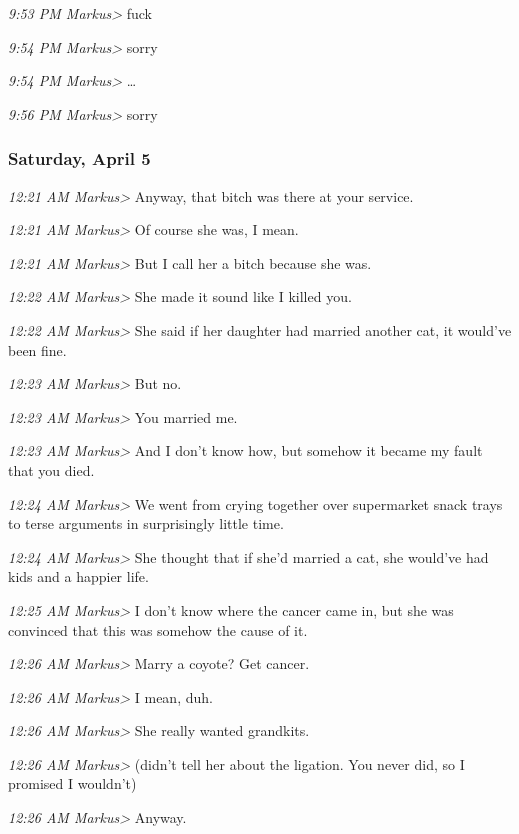 {\emph{9:53 PM Markus\textgreater{}} fuck

\emph{9:54 PM Markus\textgreater{}} sorry

\emph{9:54 PM Markus\textgreater{}} \ldots{}

\emph{9:56 PM Markus\textgreater{}} sorry

\subsubsection*{Saturday, April 5}\label{saturday-april-5}

\emph{12:21 AM Markus\textgreater{}} Anyway, that bitch was there at
your service.

\emph{12:21 AM Markus\textgreater{}} Of course she was, I mean.

\emph{12:21 AM Markus\textgreater{}} But I call her a bitch because she
was.

\emph{12:22 AM Markus\textgreater{}} She made it sound like I killed
you.

\emph{12:22 AM Markus\textgreater{}} She said if her daughter had
married another cat, it would've been fine.

\emph{12:23 AM Markus\textgreater{}} But no.

\emph{12:23 AM Markus\textgreater{}} You married me.

\emph{12:23 AM Markus\textgreater{}} And I don't know how, but somehow
it became my fault that you died.

\emph{12:24 AM Markus\textgreater{}} We went from crying together over
supermarket snack trays to terse arguments in surprisingly little time.

\emph{12:24 AM Markus\textgreater{}} She thought that if she'd married a
cat, she would've had kids and a happier life.

\emph{12:25 AM Markus\textgreater{}} I don't know where the cancer came
in, but she was convinced that this was somehow the cause of it.

\emph{12:26 AM Markus\textgreater{}} Marry a coyote? Get cancer.

\emph{12:26 AM Markus\textgreater{}} I mean, duh.

\emph{12:26 AM Markus\textgreater{}} She really wanted grandkits.

\emph{12:26 AM Markus\textgreater{}} (didn't tell her about the
ligation. You never did, so I promised I wouldn't)

\emph{12:26 AM Markus\textgreater{}} Anyway.

}
